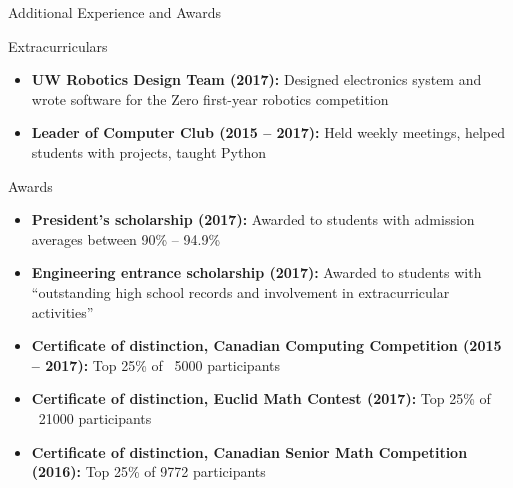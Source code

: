 \documentclass[calibri]{mcdowellcv}
\begin{document}
    \begin{cvsection}{\Large{Additional Experience and Awards}}
        \begin{cvsubsection}{Extracurriculars}{}{}
            \begin{itemize}
                \item \textbf{UW Robotics Design Team (2017):} Designed electronics system and wrote software for the Zero first-year robotics competition
                \item \textbf{Leader of Computer Club (2015 -- 2017):} Held weekly meetings, helped students with projects, taught Python
            \end{itemize}
        \end{cvsubsection}
        \begin{cvsubsection}{Awards}{}{}
            \begin{itemize}
                \item \textbf{President's scholarship (2017):} Awarded to students with admission averages between 90\% -- 94.9\%
                \item \textbf{Engineering entrance scholarship (2017):} Awarded to students with ``outstanding high school records and involvement in extracurricular activities''
                \item \textbf{Certificate of distinction, Canadian Computing Competition (2015 -- 2017):} Top 25\% of ~5000 participants
                \item \textbf{Certificate of distinction, Euclid Math Contest (2017):} Top 25\% of ~21000 participants
                \item \textbf{Certificate of distinction, Canadian Senior Math Competition (2016):} Top 25\% of 9772 participants
            \end{itemize}
        \end{cvsubsection}
    \end{cvsection}
\end{document}
